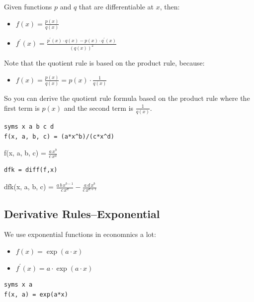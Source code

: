 \documentclass[
]{book}
\providecommand{\tightlist}{%
  \setlength{\itemsep}{0pt}\setlength{\parskip}{0pt}}
\begin{document}
Given functions \(p\) and \(q\) that are differentiable at \(x\), then:

\begin{itemize}
\item
  \(\displaystyle f(x)=\frac{p(x)}{q(x)}\)
\item
  \(\displaystyle f^{\prime } (x)=\frac{p^{\prime } (x)\cdot q(x)-p(x)\cdot q^{\prime } (x)}{(q(x))^2 }\)
\end{itemize}

Note that the quotient rule is based on the product rule, because:

\begin{itemize}
\tightlist
\item
  \(\displaystyle f(x)=\frac{p(x)}{q(x)}=p(x)\cdot \frac{1}{q(x)}\)
\end{itemize}

So you can derive the quotient rule formula based on the product rule
where the first term is \(p(x)\) and the second term is \(\frac{1}{q(x)}\).

\begin{verbatim}
syms x a b c d
f(x, a, b, c) = (a*x^b)/(c*x^d)
\end{verbatim}

f(x, a, b, c) = \(\displaystyle \frac{a\,x^b }{c\,x^d }\)

\begin{verbatim}
dfk = diff(f,x)
\end{verbatim}

dfk(x, a, b, c) =
\(\displaystyle \frac{a\,b\,x^{b-1} }{c\,x^d }-\frac{a\,d\,x^b }{c\,x^{d+1} }\)

\hypertarget{derivative-rulesexponential}{%
\subsection{Derivative Rules--Exponential}\label{derivative-rulesexponential}}

We use exponential functions in economnics a lot:

\begin{itemize}
\item
  \(\displaystyle f(x)=\exp (a\cdot x)\)
\item
  \(\displaystyle f^{\prime } (x)=a\cdot \exp (a\cdot x)\)
\end{itemize}

\begin{verbatim}
syms x a
f(x, a) = exp(a*x)
\end{verbatim}
\end{document}
